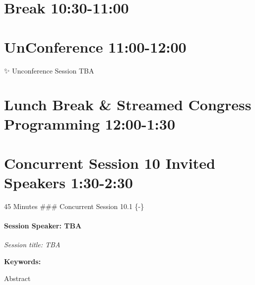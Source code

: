 \documentclass[
]{book}
\begin{document}
\hypertarget{break-1030-1100-1}{%
\section*{Break \textbar{} 10:30-11:00}\label{break-1030-1100-1}}

\hypertarget{unconference-1100-1200}{%
\section{\texorpdfstring{\textbf{UnConference} \textbar{} 11:00-12:00}{UnConference \textbar{} 11:00-12:00}}\label{unconference-1100-1200}}

\begin{protip}
✨ Unconference Session TBA
\end{protip}

\hypertarget{lunch-break-streamed-congress-programming-1200-130}{%
\section*{Lunch Break \& Streamed Congress Programming \textbar{} 12:00-1:30}\label{lunch-break-streamed-congress-programming-1200-130}}

\hypertarget{concurrent-session-10-invited-speakers-130-230}{%
\section*{Concurrent Session 10 \textbar{} Invited Speakers \textbar{} 1:30-2:30}\label{concurrent-session-10-invited-speakers-130-230}}

45 Minutes
\#\#\# Concurrent Session 10.1 \{-\}

\begin{speaker}
\hypertarget{session-speaker-tba}{%
\paragraph{\texorpdfstring{Session Speaker:
\textbf{TBA}}{Session Speaker: TBA}}\label{session-speaker-tba}}

\emph{Session title: TBA}

\textbf{Keywords:}

Abstract
\end{speaker}
\end{document}
